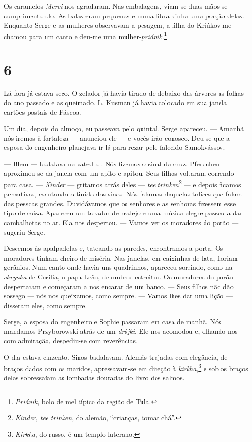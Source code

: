 Os caramelos \emph{Merci} nos agradaram. Nas embalagens, viam-se duas
mãos se cumprimentando. As balas eram pequenas e numa libra vinha uma
porção delas. Enquanto Serge e as mulheres observavam a pesagem, a filha
do Kriúkov me chamou para um canto e deu-me uma
mulher-\emph{priánik}.\footnote{\emph{Priánik}, bolo de mel típico da
  região de Tula.}

\section{6}

Lá fora já estava seco. O zelador já havia tirado de debaixo das árvores
as folhas do ano passado e as queimado. L. Kusman já havia colocado em
sua janela cartões-postais de Páscoa.

Um dia, depois do almoço, eu passeava pelo quintal. Serge apareceu. ---
Amanhã nós iremos à fortaleza --- anunciou ele --- e vocês irão conosco.
Deu-se que a esposa do engenheiro planejava ir lá para rezar pelo
falecido Samokvássov.

--- Blem --- badalava na catedral. Nós fizemos o sinal da cruz.
Pferdchen aproximou-se da janela com um apito e apitou. Seus filhos
voltaram correndo para casa. --- \emph{Kinder} --- gritamos atrás deles
--- \emph{tee trinken}\footnote{\emph{Kinder, tee trinken}, do alemão,
  ``crianças, tomar chá''.} --- e depois ficamos pensativos, escutando o
tinido dos sinos. Nós falamos daquelas tolices que falam das pessoas
grandes. Duvidávamos que os senhores e as senhoras fizessem esse tipo de
coisa. Apareceu um tocador de realejo e uma música alegre passou a dar
cambalhotas no ar. Ela nos despertou. --- Vamos ver os moradores do
porão --- sugeriu Serge.

Descemos às apalpadelas e, tateando as paredes, encontramos a porta. Os
moradores tinham cheiro de miséria. Nas janelas, em caixinhas de lata,
floriam gerânios. Num canto onde havia uns quadrinhos, apareceu
sorrindo, como na \emph{skrynka} de Cecília, o papa Leão, de ombros
estreitos. Os moradores do porão despertaram e começaram a nos encarar
de um banco. --- Seus filhos não dão sossego --- nós nos queixamos, como
sempre. --- Vamos lhes dar uma lição --- disseram eles, como sempre.

Serge, a esposa do engenheiro e Sophie passaram em casa de manhã. Nós
mandamos Przyborowski atrás de um \emph{drójki}. Ele nos acomodou e,
olhando-nos com admiração, despediu-se com reverências.

O dia estava cinzento. Sinos badalavam. Alemãs trajadas com elegância,
de braços dados com os maridos, apressavam-se em direção à
\emph{kirkha},\footnote{\emph{Kirkha}, do russo, é um templo luterano.}
e sob os braços delas sobressaíam as lombadas douradas do livro dos
salmos.

